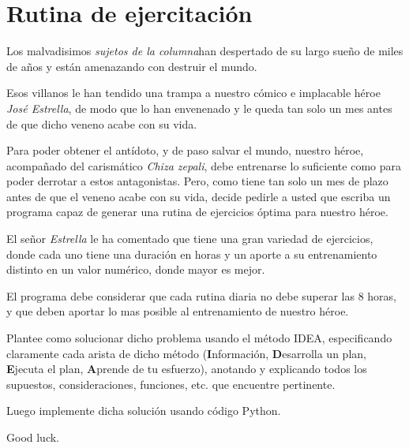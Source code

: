 \section{Rutina de ejercitación}

Los malvadisimos \textit{sujetos de la columna}\texttrademark han despertado de su largo sueño de miles de años y están amenazando con destruir el mundo.

Esos villanos le han tendido una trampa a nuestro cómico e implacable héroe \textit{José Estrella}, de modo que lo han envenenado y le queda tan solo un mes  antes de que dicho veneno acabe con su vida.

Para poder obtener el antídoto, y de paso salvar el mundo, nuestro héroe, acompañado del carismático \textit{Chiza zepali}, debe entrenarse lo suficiente como para poder derrotar a estos antagonistas. Pero, como tiene tan solo un mes de plazo antes de que el veneno acabe con su vida, decide pedirle a usted que escriba un programa capaz de generar una rutina de ejercicios óptima para nuestro héroe.

El señor \textit{Estrella} le ha comentado que tiene una gran variedad de ejercicios, donde cada uno tiene una duración en horas y un aporte a su entrenamiento distinto en un valor numérico, donde mayor es mejor.

El programa debe considerar que cada rutina diaria no debe superar las 8 horas, y que deben aportar lo mas posible al entrenamiento de nuestro héroe.

Plantee como solucionar dicho problema usando el método IDEA, especificando claramente cada arista de dicho método (\textbf{I}nformación, \textbf{D}esarrolla un plan, \textbf{E}jecuta el plan, \textbf{A}prende de tu esfuerzo), anotando y explicando todos los supuestos, consideraciones, funciones, etc. que encuentre pertinente. 

Luego implemente dicha solución usando código Python.

Good luck.
